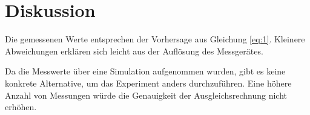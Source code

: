 \section{Diskussion}
\label{sec:Diskussion}
Die gemessenen Werte entsprechen der Vorhersage aus Gleichung \eqref{eq:1}.
Kleinere Abweichungen erklären sich leicht aus der Auflösung des Messgerätes.

Da die Messwerte über eine Simulation aufgenommen wurden, gibt es keine konkrete Alternative,
um das Experiment anders durchzuführen.
Eine höhere Anzahl von Messungen würde die Genauigkeit der Ausgleichsrechnung nicht erhöhen.